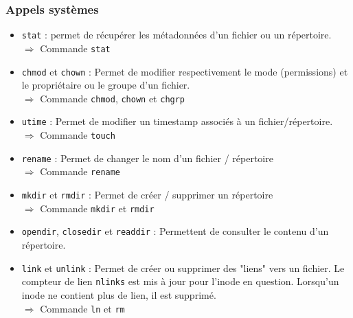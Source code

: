 \subsubsection{Appels systèmes}
\begin{itemize}
  \item \texttt{stat} : permet de récupérer les métadonnées d'un fichier ou un répertoire.\\
    $\Rightarrow$ Commande \texttt{stat}
  \item \texttt{chmod} et \texttt{chown} : Permet de modifier respectivement le mode (permissions) et le propriétaire ou le groupe d'un fichier.\\
    $\Rightarrow$ Commande \texttt{chmod}, \texttt{chown} et \texttt{chgrp}
  \item \texttt{utime} : Permet de modifier un timestamp associés à un fichier/répertoire. \\
    $\Rightarrow$ Commande \texttt{touch}
  \item \texttt{rename} : Permet de changer le nom d'un fichier / répertoire\\
    $\Rightarrow$ Commande \texttt{rename}
  \item \texttt{mkdir} et \texttt{rmdir} : Permet de créer / supprimer un répertoire\\
    $\Rightarrow$ Commande \texttt{mkdir} et \texttt{rmdir}
  \item \texttt{opendir}, \texttt{closedir} et \texttt{readdir} : Permettent de consulter le contenu d'un répertoire.
  \item \texttt{link} et \texttt{unlink} : Permet de créer ou supprimer des "liens" vers un fichier. Le compteur de lien \texttt{nlinks} est mis à jour pour l'inode en question. Lorsqu'un inode ne contient plus de lien, il est supprimé. \\
    $\Rightarrow$ Commande \texttt{ln} et \texttt{rm}
\end{itemize}

